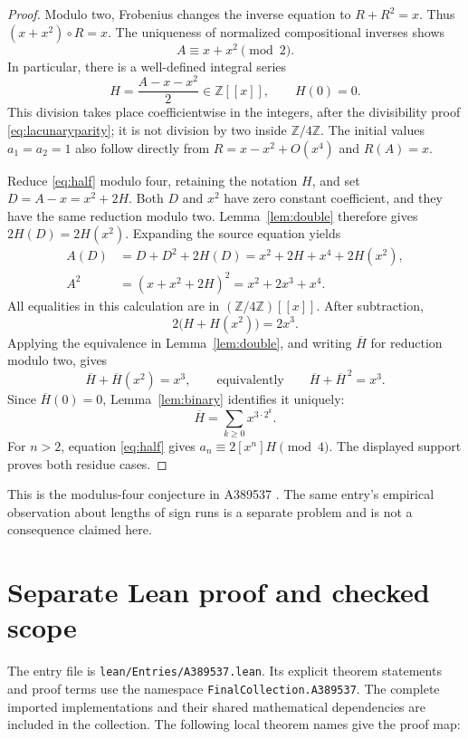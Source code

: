 \documentclass[11pt,a4paper]{article}
\theoremstyle{remark}
\newcommand{\Z}{\mathbb Z}
\newcommand{\ps}[1]{#1[[x]]}
\begin{document}
\begin{proof}
Modulo two, Frobenius changes the inverse equation to $R+R^2=x$.
Thus $(x+x^2)\circ R=x$. The uniqueness of normalized compositional
inverses shows
\begin{equation}\label{eq:lacunaryparity}
 A\equiv x+x^2\pmod2.
\end{equation}
In particular, there is a well-defined integral series
\begin{equation}\label{eq:half}
 H=\frac{A-x-x^2}{2}\in\ps{\Z},\qquad H(0)=0.
\end{equation}
This division takes place coefficientwise in the integers, after the
divisibility proof \eqref{eq:lacunaryparity}; it is not division by two
inside $\Z/4\Z$. The initial values $a_1=a_2=1$ also follow directly
from $R=x-x^2+O(x^4)$ and $R(A)=x$.

Reduce \eqref{eq:half} modulo four, retaining the notation $H$, and set
$D=A-x=x^2+2H$. Both $D$ and $x^2$ have zero constant coefficient,
and they have the same reduction modulo two. Lemma~\ref{lem:double}
therefore gives $2H(D)=2H(x^2)$. Expanding the source equation yields
\begin{align*}
 A(D)&=D+D^2+2H(D)
       =x^2+2H+x^4+2H(x^2),\\
 A^2&=(x+x^2+2H)^2=x^2+2x^3+x^4.
\end{align*}
All equalities in this calculation are in $(\Z/4\Z)[[x]]$.
After subtraction,
\[
 2\bigl(H+H(x^2)\bigr)=2x^3.
\]
Applying the equivalence in Lemma~\ref{lem:double}, and writing
$\overline H$ for reduction modulo two, gives
\[
 \overline H+\overline H(x^2)=x^3,
 \qquad\text{equivalently}\qquad
 \overline H+\overline H^{\,2}=x^3.
\]
Since $\overline H(0)=0$, Lemma~\ref{lem:binary} identifies it uniquely:
\[
 \overline H=\sum_{k\ge0}x^{3\cdot2^k}.
\]
For $n>2$, equation \eqref{eq:half} gives $a_n\equiv2[x^n]H\pmod4$.
The displayed support proves both residue cases.
\end{proof}

This is the modulus-four conjecture in A389537 \cite{oeis537}.
The same entry's empirical observation about lengths of sign runs is a
separate problem and is not a consequence claimed here.


\section{Separate Lean proof and checked scope}

The entry file is \nolinkurl{lean/Entries/A389537.lean}. Its explicit
theorem statements and proof terms use the namespace
\nolinkurl{FinalCollection.A389537}. The complete imported implementations
and their shared mathematical dependencies are included in the collection.
The following local theorem names give the proof map:
\end{document}
